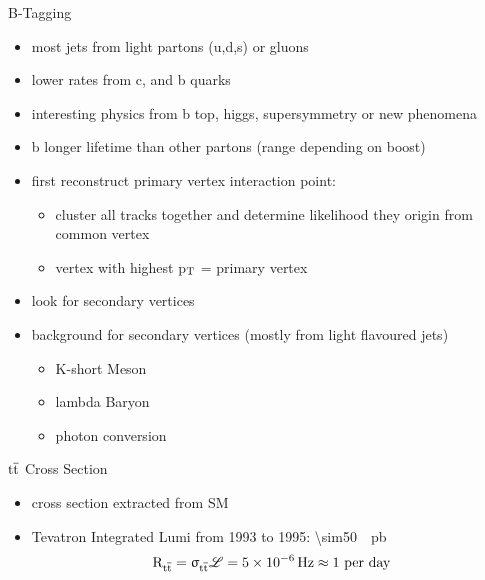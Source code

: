 \begin{frame}{B-Tagging}

	\begin{itemize}\itemfill
		\item most jets from light partons (u,d,s) or gluons
		\item lower rates from c, and b quarks
		\item interesting physics from b \ra top, higgs, supersymmetry or new phenomena
		\item b longer lifetime than other partons (\ra range  depending on boost)
		\item first reconstruct primary vertex \ra interaction point:
		\begin{itemize}
			\item cluster all tracks together and determine likelihood they origin from common vertex
			\item vertex with highest p$_{\text{T}}$ = primary vertex
		\end{itemize}
		\item look for secondary vertices
	\end{itemize}
	\begin{minipage}[c][.22\textheight]{.5\textwidth}
		\begin{itemize}
			\item background for secondary vertices (mostly from light flavoured jets)
			\begin{itemize}
				\item K-short Meson
				\item lambda Baryon 
				\item photon conversion 
			\end{itemize}
		\end{itemize}
	\end{minipage}
	\begin{minipage}{.45\textwidth}
	\end{minipage}



\end{frame}
\begin{frame}{$\text{t}\overline{\text{t}}$ Cross Section}

	\vspace*{-10pt}\vspace*{-10pt}
	
	\begin{itemize}\itemfill
		\item cross section extracted from SM
		\item Tevatron Integrated Lumi from 1993 to 1995: \SI{\sim50}{\per\pico\barn}
		\begin{equation*} \text{R}_{\text{t}\overline{\text{t}}} = \upsigma_{\text{t}\overline{\text{t}}}\mathscr{L} = \SI{5e-6}{\hertz} \approx 1 \text{ per day} \end{equation*}

	\end{itemize}

\end{frame}
